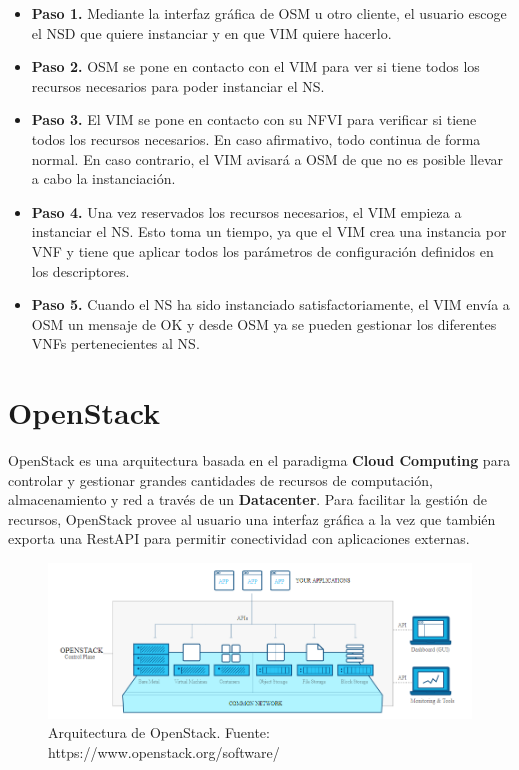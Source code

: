 \begin{itemize}
	\item \textbf{Paso 1.} Mediante la interfaz gráfica de OSM u otro cliente, el usuario escoge el NSD que quiere instanciar y en que VIM quiere hacerlo.
	
	\item \textbf{Paso 2.} OSM se pone en contacto con el VIM para ver si tiene todos los recursos necesarios para poder instanciar el NS.
	
	\item \textbf{Paso 3.} El VIM se pone en contacto con su NFVI para verificar si tiene todos los recursos necesarios. En caso afirmativo, todo continua de forma normal. En caso contrario, el VIM avisará a OSM de que no es posible llevar a cabo la instanciación.
	
	\item \textbf{Paso 4.} Una vez reservados los recursos necesarios, el VIM empieza a instanciar el NS. Esto toma un tiempo, ya que el VIM crea una instancia por VNF y tiene que aplicar todos los parámetros de configuración definidos en los descriptores.
	
	\item \textbf{Paso 5.} Cuando el NS ha sido instanciado satisfactoriamente, el VIM envía a OSM un mensaje de OK y desde OSM ya se pueden gestionar los diferentes VNFs pertenecientes al NS.
\end{itemize}


\section{OpenStack}
\label{sec:openstack}

OpenStack es una arquitectura basada en el paradigma \textbf{Cloud Computing} para controlar y gestionar grandes cantidades de recursos de computación, almacenamiento y red a través de un \textbf{Datacenter}. Para facilitar la gestión de recursos, OpenStack provee al usuario una interfaz gráfica a la vez que también exporta una RestAPI para permitir conectividad con aplicaciones externas.

\begin{figure}[!ht]
	\centering
	\includegraphics[width=0.9\linewidth]{imagenes/openstack_arch}
	\caption{Arquitectura de OpenStack. Fuente: https://www.openstack.org/software/}
	\label{fig:openstackarch}
\end{figure}

